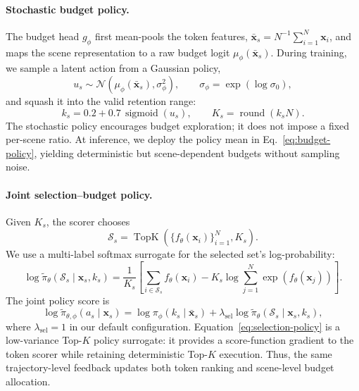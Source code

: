 \documentclass[letterpaper]{article} %
\begin{document}
\paragraph{Stochastic budget policy.}
The budget head $g_\phi$ first mean-pools the token features,
$\bar{\mathbf{x}}_s=N^{-1}\sum_{i=1}^{N}\mathbf{x}_i$, and maps the scene
representation to a raw budget logit $\mu_\phi(\bar{\mathbf{x}}_s)$. During
training, we sample a latent action from a Gaussian policy,
\begin{equation}
 u_s \sim \mathcal{N}\!\left(
 \mu_\phi(\bar{\mathbf{x}}_s),\sigma_\phi^2\right),
 \qquad \sigma_\phi=\exp(\log\sigma_0),
\end{equation}
and squash it into the valid retention range:
\begin{equation}
 k_s = 0.2 + 0.7\,\operatorname{sigmoid}(u_s),
 \qquad K_s=\operatorname{round}(k_sN).
\label{eq:budget-policy}
\end{equation}
The stochastic policy encourages budget exploration; it does not impose a
fixed per-scene ratio. At inference, we deploy the policy mean in
Eq.~\ref{eq:budget-policy}, yielding deterministic but scene-dependent budgets
without sampling noise.

\paragraph{Joint selection--budget policy.}
Given $K_s$, the scorer chooses
\begin{equation}
\mathcal{S}_s =
\operatorname{TopK}
\left(\{f_\theta(\mathbf{x}_i)\}_{i=1}^{N},K_s\right).
\end{equation}
We use a multi-label softmax surrogate for the selected set's log-probability:
\begin{equation}
\log\widetilde{\pi}_\theta(\mathcal{S}_s\mid\mathbf{x}_s,k_s)
=
\frac{1}{K_s}\left[
\sum_{i\in\mathcal{S}_s} f_\theta(\mathbf{x}_i)
-K_s\log\sum_{j=1}^{N}
\exp\left(f_\theta(\mathbf{x}_j)\right)
\right].
\label{eq:selection-policy}
\end{equation}
The joint policy score is
\begin{equation}
\log\widetilde{\pi}_{\theta,\phi}(a_s\mid\mathbf{x}_s)
=
\log\pi_\phi(k_s\mid\bar{\mathbf{x}}_s)
+\lambda_{\mathrm{sel}}
\log\widetilde{\pi}_\theta
(\mathcal{S}_s\mid\mathbf{x}_s,k_s),
\label{eq:joint-policy}
\end{equation}
where $\lambda_{\mathrm{sel}}{=}1$ in our default configuration.
Equation~\ref{eq:selection-policy} is a low-variance Top-$K$ policy surrogate:
it provides a score-function gradient to the token scorer while retaining
deterministic Top-$K$ execution. Thus, the same trajectory-level feedback
updates both token ranking and scene-level budget allocation.
\end{document}
